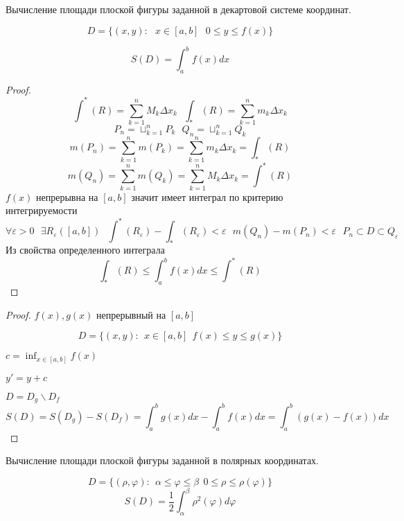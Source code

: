 \begin{title}[\Large]
  Вычисление площади плоской фигуры заданной в декартовой системе координат.
\end{title}

\begin{defin}
 $$
  D = \{ (x,y): ~~~ x \in [a,b]  ~~~ 0 \le y \le f(x) \}
 $$
\end{defin}

\begin{theorem}
  $$
  S(D) = \int_a^b f(x) dx
  $$
\end{theorem}

\begin{proof}
  $$
  \int^* (R) = \sum_{k=1}^n M_k \Delta x_k ~~~
  \int_* (R) = \sum_{k=1}^n m_k \Delta x_k
  $$
  $$
  P_n = \sqcup_{k=1}^n P_k ~~~
  Q_n = \sqcup_{k=1}^n Q_k
  $$
  $$
  m(P_n) = \sum_{k=1}^n m(P_k) = \sum_{k=1}^n m_k \Delta x_k = \int_* (R)
  $$
  $$
  m(Q_n) = \sum_{k=1}^n m(Q_k) = \sum_{k=1}^n M_k \Delta x_k = \int^* (R)
  $$
  $f(x)$ непрерывна на $[a,b]$ значит имеет интеграл по критерию интегрируемости
  $$
  \forall \varepsilon > 0 ~~~
  \exists R_{\varepsilon} ([a,b]) ~~~
  \int^*(R_{\varepsilon}) - \int_* (R_{\varepsilon}) < \varepsilon ~~~
  m(Q_n) - m(P_n) < \varepsilon ~~~
  P_n \subset D \subset Q_{\varepsilon}
  $$
  Из свойства определенного интеграла
  $$
  \int_* (R) \le \int_a^b f(x)dx \le \int^* (R)
  $$
\end{proof}

\begin{proof}
  $f(x),g(x)$ непрерывный на $[a,b]$

  $$
  D = \{ (x,y): ~~ x \in [a,b] ~~ f(x) \le y \le g(x) \}
  $$

  $c = \inf_{x \in [a,b]} f(x)$

  $y' = y + c$

  $D = D_g \backslash D_f$
  $$
  S(D) = S(D_g) - S(D_f) = \int_a^b g(x)dx - \int_a^b f(x)dx =
  \int_a^b (g(x) - f(x)) dx
  $$
\end{proof}

\begin{title}[\Large]
  Вычисление площади плоской фигуры заданной в полярных координатах.
\end{title}

\begin{theorem}
  $$
  D = \{ (\rho,\varphi): ~~ \alpha \le \varphi \le \beta ~~ 0 \le
  \rho \le \rho(\varphi) \}
  $$
  $$
  S(D) = \frac{1}{2} \int_{\alpha}^{\beta} \rho^2(\varphi) d\varphi
  $$
\end{theorem}

